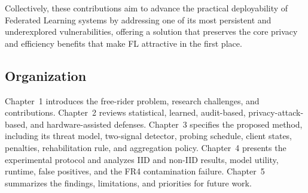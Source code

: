 Collectively, these contributions aim to advance the practical deployability of Federated Learning systems by addressing one of its most persistent and underexplored vulnerabilities, offering a solution that preserves the core privacy and efficiency benefits that make FL attractive in the first place.


\subsection{Organization}
Chapter~1 introduces the free-rider problem, research challenges, and contributions. Chapter~2 reviews statistical, learned, audit-based, privacy-attack-based, and hardware-assisted defenses. Chapter~3 specifies the proposed method, including its threat model, two-signal detector, probing schedule, client states, penalties, rehabilitation rule, and aggregation policy. Chapter~4 presents the experimental protocol and analyzes IID and non-IID results, model utility, runtime, false positives, and the FR4 contamination failure. Chapter~5 summarizes the findings, limitations, and priorities for future work.
